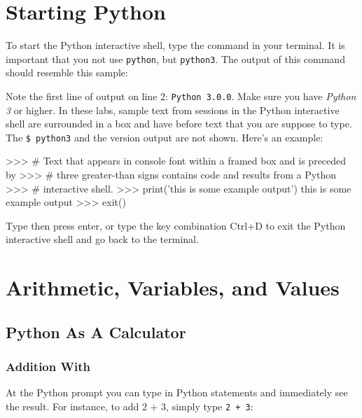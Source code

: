 \documentclass[11pt]{cselabheader}
\begin{document}
\section{Starting Python}

To start the Python interactive shell, type the command
 in your terminal.  It is important that you not
use \texttt{python}, but \texttt{python3}. The output of this command
should resemble this sample:


Note the first line of output on line 2: \texttt{Python 3.0.0}.
Make sure you have \textsl{Python 3} or higher.
In these labs, sample text from sessions in the Python interactive shell
are surrounded in a box and have \bashinline{>>>} before text
that you are suppose to type. The \texttt{\$ python3} and the version
output are not shown.
Here's an example:

\begin{pyconcode}
>>> # Text that appears in console font within a framed box and is preceded by
>>> # three greater-than signs contains code and results from a Python
>>> # interactive shell.
>>> print('this is some example output')
this is some example output
>>> exit()

\end{pyconcode}

Type  then press enter, or type the key combination
Ctrl+D to exit the Python interactive shell and go back to the terminal.

\section{Arithmetic, Variables, and Values}

\subsection{Python As A Calculator}

\subsubsection{Addition With \pythoninline{+}}

At the Python prompt \pyconinline{>>>} you can type in Python statements and
immediately see the result. For instance, to add 2 + 3, simply type \texttt{2 +
3}:
\end{document}
